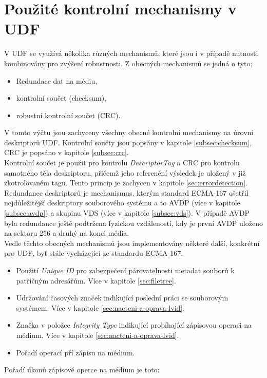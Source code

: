 \section{Použité kontrolní mechanismy v UDF}
\label{sec:kontrolni-mechanismy}
V UDF se využívá několika různých mechanismů, které jsou i v případě nutnosti kombinovány pro zvýšení robustnosti. Z obecných mechanismů se jedná o tyto:
\begin{itemize}
    \item Redundace dat na médiu,
    \item kontrolní součet (checksum),
    \item robustní kontrolní součet (CRC).
\end{itemize}
V tomto výčtu jsou zachyceny všechny obecné kontrolní mechanismy na úrovni deskriptorů UDF. Kontrolní součty jsou popsány v kapitole \ref{subsec:checksum}, CRC je popsáno v kapitole \ref{subsec:crc}.\\
Kontrolní součet je použit pro kontrolu \textit{DescriptorTag} a CRC pro kontrolu samotného těla deskriptoru, přičemž jeho referenční výsledek je uložený v již zkotrolovaném tagu. Tento princip je zachycen v kapitole \ref{sec:errordetection}.\\
Redundance deskriptorů je mechanismus, kterým standard ECMA-167 ošetřil nejdůležitější deskriptory souborového systému a to AVDP (více v kapitole \ref{subsec:avdp}) a skupinu VDS (více v kapitole \ref{subsec:vds}). V případě AVDP byla redundance ještě podtržena fyzickou vzdáleností, kdy je první AVDP uloženo na sektoru 256 a druhý na konci média.\\
Vedle těchto obecných mechanismů jsou implementovány některé další, konkrétní pro UDF, byť stále vycházející ze standardu ECMA-167.
\begin{itemize}
    \item Použití \textit{Unique ID} pro zabezpečení párovatelnosti metadat souborů k patřičným adresářům. Více v kapitole \ref{sec:filetree}. 
    \item Udržování časových značek indikující poslední práci se souborovým systémem. Více v kapitole \ref{sec:nacteni-a-oprava-lvid}.
    \item Značka v položce \textit{Integrity Type} indikující probíhající zápisovou operaci na médium. Více v kapitole \ref{sec:nacteni-a-oprava-lvid}.
    \item Pořadí operací pří zápisu na médium.
\end{itemize}
Pořadí úkonů zápisové operce na médium je toto:
